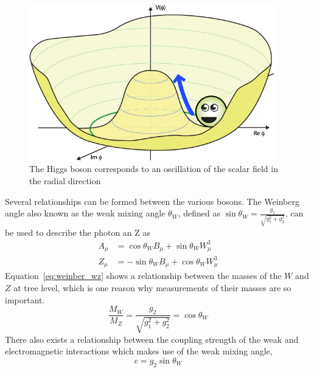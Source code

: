 \begin{figure}[hbt]
	\begin{center}
		\includegraphics[width=0.95\textwidth]{figures/Chapter2/Higgs-Potential-radial.png}
		\caption{The Higgs boson corresponds to an oscillation of the scalar field in the radial direction~\cite{Tanedo}}
		\label{fig:higgs_potential_radial}
	\end{center}
\end{figure}

Several relationships can be formed between the various bosons.
The Weinberg angle also known as the weak mixing angle $\theta_{W}$, defined as $\sin\theta_{W}=\frac{g_{1}}{\sqrt{g_{1}^{2}+g_{2}^{2}}}$, can be used to describe the photon an Z as
\begin{align}
	A_{\mu}&=\cos\theta_{W}B_{\mu}+\sin\theta_{W}W_{\mu}^{3}\\
	Z_{\mu}&=-\sin\theta_{W}B_{\mu}+\cos\theta_{W}W_{\mu}^{3}
\end{align}
Equation~\ref{eq:weinber_wz} shows a relationship between the masses of the $W$ and $Z$ at tree level, which is one reason why measurements of their masses are so important.
\begin{equation}\label{eq:weinber_wz}
	\frac{M_{W}}{M_{Z}}=\frac{g_{2}}{\sqrt{g_{1}^{2}+g_{2}^{2}}}=\cos\theta_{W}
\end{equation}
There also exists a relationship between the coupling strength of the weak and electromagnetic interactions which makes use of the weak mixing angle,
\begin{equation}
	e=g_{2}\sin\theta_{W}
\end{equation}


